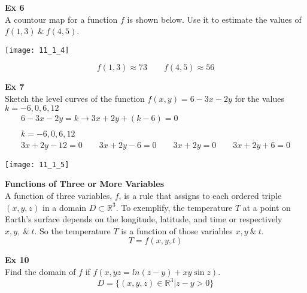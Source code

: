 \documentclass{article}
\begin{document}
  \textbf{Ex 6}\\
  A countour map for a function $ f $ is shown below. Use it to estimate the values of $ f(1,3) ~\&~ f(4,5)$.
  \begin{center}
    \texttt{[image: 11\_1\_4]}
  \end{center}
  \[
    f(1,3) \approx 73 \qquad f(4,5) \approx 56
  \]

  \textbf{Ex 7}\\
  Sketch the level curves of the function $ f(x,y) =6-3x-2y$ for the values $ k=-6,0,6,12 $
  \[
    \begin{gathered}
      6-3x-2y=k \to 3x+2y+(k-6)=0\\
      ~\\
      k=-6,0,6,12\\
      3x+2y-12=0 \qquad 3x+2y-6=0 \qquad 3x+2y=0 \qquad 3x+2y+6=0
    \end{gathered}
  \]
  \begin{center}
    \texttt{[image: 11\_1\_5]}
  \end{center}
 
  \textbf{Functions of Three or More Variables}\\
  A function of three variables, $ f $, is a rule that assigns to each ordered triple $ (x,y,z) $ in a domain $ D \subset \mathbb{R}^{3} $. To exemplify, the temperature $ T $ at a point on Earth's surface depends on the longitude, latitude, and time or respectively $ x,y,~\&~ t $. So the temperature $ T $ is a function of those variables $ x,y ~\&~ t $.
  \[
    T=f(x,y,t)
  \]
 
  \textbf{Ex 10}\\
  Find the domain of $ f $ if $ f(x,yz=ln(z-y)+xy\sin{z}) $.
  \[
   D=\{ (x,y,z) \in \mathbb{R}^{3} | z-y>0  \} 
   \]
\end{document}
